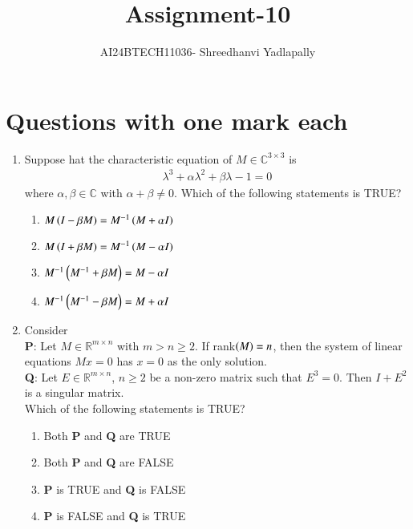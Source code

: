 \documentclass[journal,12pt,onecolumn]{IEEEtran}
\theoremstyle{remark}
\begin{document}

\vspace{3cm}

\title{Assignment-10}
\author{AI24BTECH11036- Shreedhanvi Yadlapally}
\maketitle

\bigskip
\renewcommand{\thefigure}{\theenumi}
\renewcommand{\thetable}{\theenumi}
\section{Questions with one mark each}

\begin{enumerate}

\item Suppose hat the characteristic equation of $M \in \mathbb{C}^{3 \times 3}$ is 
	\begin{align*}
		\lambda^{3}+\alpha \lambda^{2} + \beta \lambda -1=0
	\end{align*}
where $\alpha, \beta \in \mathbb{C}$ with $\alpha+\beta \neq 0$. Which of the following statements is TRUE?
	\begin{enumerate}
		\item $M\left(I-\beta M\right)=M^{-1} \left(M+ \alpha I\right)$
		\item $M\left(I+\beta M\right)=M^{-1} \left(M- \alpha I\right)$
		\item $M^{-1}\left(M^{-1}+\beta M\right)=M-\alpha I$
		\item $M^{-1}\left(M^{-1}-\beta M\right)=M+\alpha I$
	\end{enumerate}

\item Consider \\
\textbf{P}: Let $M \in \mathbb{R}^{m \times n}$ with $m>n\geq 2$. If rank$\left(M\right)=n$, then the system of linear equations $Mx=0$ has $x=0$ as the only solution. \\
\textbf{Q}: Let $E \in \mathbb{R}^{m \times n}$, $n\geq 2$ be a non-zero matrix such that $E^{3}=0$. Then $I+E^2$ is a singular matrix. \\
Which of the following statements is TRUE?
	\begin{enumerate}
		\item Both \textbf{P} and \textbf{Q} are TRUE
		\item Both \textbf{P} and \textbf{Q} are FALSE
		\item \textbf{P} is TRUE and \textbf{Q} is FALSE
		\item \textbf{P} is FALSE and \textbf{Q} is TRUE
	\end{enumerate}


\end{enumerate}
\end{document}
